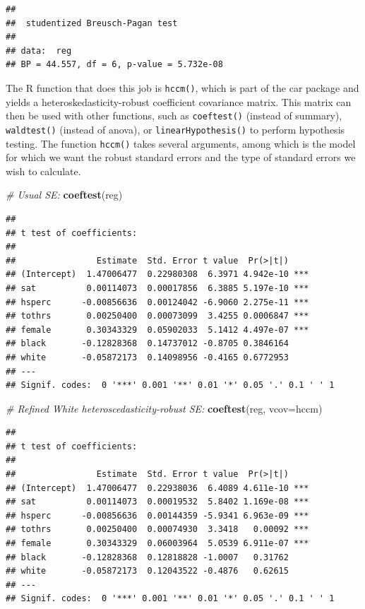 \documentclass[]{book}
\newenvironment{Shaded}{\begin{snugshade}}{\end{snugshade}}
\newcommand{\CommentTok}[1]{\textcolor[rgb]{0.56,0.35,0.01}{\textit{#1}}}
\newcommand{\DataTypeTok}[1]{\textcolor[rgb]{0.13,0.29,0.53}{#1}}
\newcommand{\KeywordTok}[1]{\textcolor[rgb]{0.13,0.29,0.53}{\textbf{#1}}}
\newcommand{\NormalTok}[1]{#1}
\begin{document}
\begin{verbatim}
## 
##  studentized Breusch-Pagan test
## 
## data:  reg
## BP = 44.557, df = 6, p-value = 5.732e-08
\end{verbatim}

The R function that does this job is \texttt{hccm()}, which is part of the car package and yields a heteroskedasticity-robust coefficient covariance matrix. This matrix can then be used with other functions, such as \texttt{coeftest()} (instead of summary), \texttt{waldtest()} (instead of anova), or \texttt{linearHypothesis()} to perform hypothesis testing. The function \texttt{hccm()} takes several arguments, among which is the model for which we want the robust standard errors and the type of standard errors we wish to calculate.

\begin{Shaded}
\begin{Highlighting}[]
\CommentTok{# Usual SE:}
\KeywordTok{coeftest}\NormalTok{(reg)}
\end{Highlighting}
\end{Shaded}

\begin{verbatim}
## 
## t test of coefficients:
## 
##                Estimate  Std. Error t value  Pr(>|t|)    
## (Intercept)  1.47006477  0.22980308  6.3971 4.942e-10 ***
## sat          0.00114073  0.00017856  6.3885 5.197e-10 ***
## hsperc      -0.00856636  0.00124042 -6.9060 2.275e-11 ***
## tothrs       0.00250400  0.00073099  3.4255 0.0006847 ***
## female       0.30343329  0.05902033  5.1412 4.497e-07 ***
## black       -0.12828368  0.14737012 -0.8705 0.3846164    
## white       -0.05872173  0.14098956 -0.4165 0.6772953    
## ---
## Signif. codes:  0 '***' 0.001 '**' 0.01 '*' 0.05 '.' 0.1 ' ' 1
\end{verbatim}

\begin{Shaded}
\begin{Highlighting}[]
\CommentTok{# Refined White heteroscedasticity-robust SE:}
\KeywordTok{coeftest}\NormalTok{(reg, }\DataTypeTok{vcov=}\NormalTok{hccm)}
\end{Highlighting}
\end{Shaded}

\begin{verbatim}
## 
## t test of coefficients:
## 
##                Estimate  Std. Error t value  Pr(>|t|)    
## (Intercept)  1.47006477  0.22938036  6.4089 4.611e-10 ***
## sat          0.00114073  0.00019532  5.8402 1.169e-08 ***
## hsperc      -0.00856636  0.00144359 -5.9341 6.963e-09 ***
## tothrs       0.00250400  0.00074930  3.3418   0.00092 ***
## female       0.30343329  0.06003964  5.0539 6.911e-07 ***
## black       -0.12828368  0.12818828 -1.0007   0.31762    
## white       -0.05872173  0.12043522 -0.4876   0.62615    
## ---
## Signif. codes:  0 '***' 0.001 '**' 0.01 '*' 0.05 '.' 0.1 ' ' 1
\end{verbatim}
\end{document}
